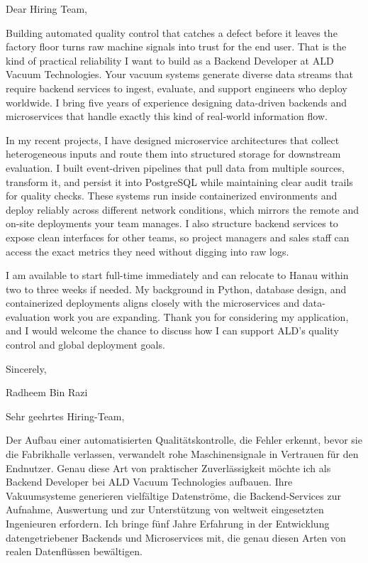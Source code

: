 \documentclass[11pt,a4paper]{coverletter}
\begin{document}

\opening{Dear Hiring Team,}

Building automated quality control that catches a defect before it leaves the factory floor turns raw machine signals into trust for the end user. That is the kind of practical reliability I want to build as a Backend Developer at ALD Vacuum Technologies. Your vacuum systems generate diverse data streams that require backend services to ingest, evaluate, and support engineers who deploy worldwide. I bring five years of experience designing data-driven backends and microservices that handle exactly this kind of real-world information flow.

In my recent projects, I have designed microservice architectures that collect heterogeneous inputs and route them into structured storage for downstream evaluation. I built event-driven pipelines that pull data from multiple sources, transform it, and persist it into PostgreSQL while maintaining clear audit trails for quality checks. These systems run inside containerized environments and deploy reliably across different network conditions, which mirrors the remote and on-site deployments your team manages. I also structure backend services to expose clean interfaces for other teams, so project managers and sales staff can access the exact metrics they need without digging into raw logs.

I am available to start full-time immediately and can relocate to Hanau within two to three weeks if needed. My background in Python, database design, and containerized deployments aligns closely with the microservices and data-evaluation work you are expanding. Thank you for considering my application, and I would welcome the chance to discuss how I can support ALD’s quality control and global deployment goals.

\closing{Sincerely,}{Radheem Bin Razi}

\clearpage
{}


\opening{Sehr geehrtes Hiring-Team,}

Der Aufbau einer automatisierten Qualitätskontrolle, die Fehler erkennt, bevor sie die Fabrikhalle verlassen, verwandelt rohe Maschinensignale in Vertrauen für den Endnutzer. Genau diese Art von praktischer Zuverlässigkeit möchte ich als Backend Developer bei ALD Vacuum Technologies aufbauen. Ihre Vakuumsysteme generieren vielfältige Datenströme, die Backend-Services zur Aufnahme, Auswertung und zur Unterstützung von weltweit eingesetzten Ingenieuren erfordern. Ich bringe fünf Jahre Erfahrung in der Entwicklung datengetriebener Backends und Microservices mit, die genau diesen Arten von realen Datenflüssen bewältigen.
\end{document}
